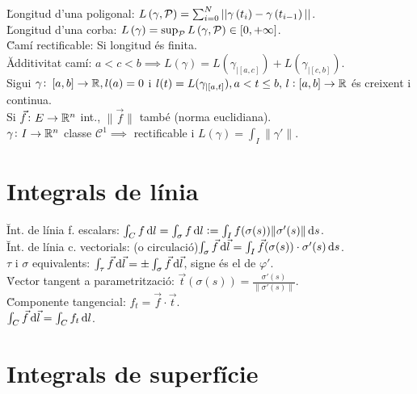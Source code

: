 \u{Longitud d'una poligonal}: $L\left( \gamma, \mathcal{P} \right) = \sum_{i=0}^N ||\gamma\left( t_i \right) - \gamma\left( t_{i-1} \right)||$. \\
\u{Longitud d'una corba}: $L\left( \gamma \right) = \sup_{\mathcal{P}} L\left( \gamma, \mathcal{P} \right) \in [0, +\infty]$. \\
\u{Camí rectificable}: Si longitud \'es finita. \\
\u{Additivitat camí}: $a<c<b \implies L\left( \gamma \right) = L( \gamma_{|\left[ a,c \right]} ) + L( \gamma_{|\left[ c, b \right]} )$. \\
\ci Sigui $\gamma\colon \left[ a,b \right]\to\mathbb{R}, l(a) = 0$ i $l(t) = L( \gamma_{|\left[ a,t \right]} ), a < t \leq b,\, l :\left[ a,b \right]\to\mathbb{R}$ \'es creixent i continua. \\
\ci Si $\vec{f}\colon E\to\mathbb{R}^n$ int., $\|\vec{f}\|$ també (norma euclidiana). \\
\ci $\gamma \colon I\to \mathbb{R}^n$ classe $\mathcal{C}^1 \implies$ rectificable i $L(\gamma) = \int_I \|\gamma'\|$.

\section{Integrals de l\'inia}

\u{Int. de l\'inia f. escalars}: $\int_C f \dif l = \int_\sigma f \dif l := \int_I f(\sigma(s)) \|\sigma'(s)\| \dif s$. \\
\u{Int. de l\'inia c. vectorials}: (o circulaci\'o)$\int_\sigma \vec{f} \dif\vec{l} = \int_I \vec{f} (\sigma(s)) \cdot \sigma'(s) \dif s$. \\
\u{$\tau$ i $\sigma$ equivalents}: $\int_\tau \vec{f} \dif \vec{l} = \pm \int_\sigma \vec{f} \dif \vec{l}$, signe \'es el de $\varphi'$. \\
\u{Vector tangent a parametritzaci\'o}: $\vec{t}(\sigma(s)) = \frac{\sigma'(s)}{\|\sigma'(s)\|}$. \\
\u{Componente tangencial}: $f_t = \vec{f}\cdot\vec{t}$. \\
\ci $\int_C \vec{f} \dif \vec{l} = \int_C f_t \dif l$. \\

\section{Integrals de superf\'icie}

